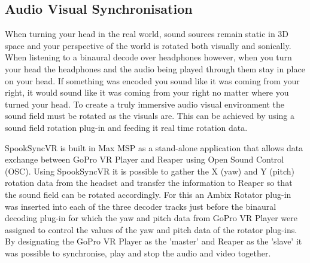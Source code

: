 		\subsection{Audio Visual Synchronisation}\label{avsync}

			When turning your head in the real world, sound sources remain static in 3D space and your perspective of the world is rotated both visually and sonically. When listening to a binaural decode over headphones however, when you turn your head the headphones and the audio being played through them stay in place on your head. If something was encoded you sound like it was coming from your right, it would sound like it was coming from your right no matter where you turned your head. To create a truly immersive audio visual environment the sound field must be rotated as the visuals are. This can be achieved by using a sound field rotation plug-in and feeding it real time rotation data. 

			SpookSyncVR \cite{SpookSync} is built in Max MSP as a stand-alone application that allows data exchange between GoPro VR Player and Reaper using Open Sound Control (OSC). Using SpookSyncVR it is possible to gather the X (yaw) and Y (pitch) rotation data from the headset and transfer the information to Reaper so that the sound field can be rotated accordingly. For this an Ambix Rotator plug-in was inserted into each of the three decoder tracks just before the binaural decoding plug-in for which the yaw and pitch data from GoPro VR Player were assigned to control the values of the yaw and pitch data of the rotator plug-ins. By designating the GoPro VR Player as the 'master' and Reaper as the 'slave' it was possible to synchronise, play and stop the audio and video together. 
	
		
